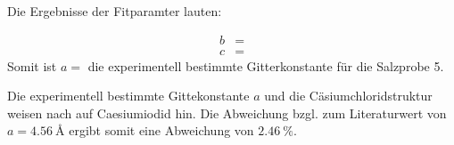 Die Ergebnisse der Fitparamter lauten:

\begin{align}
	b&=  \\
	c&= 
\end{align}
Somit ist $a=$ die experimentell bestimmte Gitterkonstante für die Salzprobe 5.

Die experimentell bestimmte Gittekonstante $a$ und die Cäsiumchloridstruktur weisen nach \cite{CsJ} auf Caesiumiodid hin. Die Abweichung bzgl. zum Literaturwert von $a=\SI{4.56}{\angstrom}$ ergibt somit eine Abweichung von $\SI{2.46}{\percent}$.



%
%
%     
%

